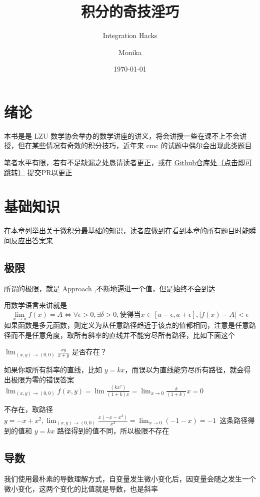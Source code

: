 \documentclass[lang=cn,newtx,10pt,scheme=chinese]{elegantbook}
\title{积分的奇技淫巧}
\subtitle{Integration Hacks}
\author{Monika}
\date{\today}
\begin{document}
\maketitle
\frontmatter

\tableofcontents

\chapter{绪论}
本书是是 LZU 数学协会举办的数学讲座的讲义，将会讲授一些在课不上不会讲授，但在某些情况有奇效的积分技巧，近年来 cmc 的试题中偶尔会出现此类题目

笔者水平有限，若有不足缺漏之处恳请读者更正，或在 \href{https://github.com/Monika-shipship/MonikaMathLecture}{Github仓库处（点击即可跳转）} 提交PR以更正
\mainmatter

\chapter{基础知识}
在本章列举出关于微积分最基础的知识，读者应做到在看到本章的所有题目时能瞬间反应出答案来
\section{极限}
所谓的极限，就是 Approach ,不断地逼进一个值，但是始终不会到达

用数学语言来讲就是
\begin{equation}
  \lim_{x \to a} f(x)=A \iff \forall \epsilon>0,\exists \delta>0, \text{使得当}x \in \left[ a-\epsilon,a+\epsilon \right], \left\vert f(x) -A\right\vert <\epsilon
\end{equation}
如果函数是多元函数，则定义为从任意路径趋近于该点的值都相同，注意是任意路径而不是任意角度，取所有斜率的直线并不能穷尽所有路径，比如下面这个
\begin{problem}
    $\lim_{(x,y) \to (0,0)} \frac{xy}{x+y} $ 是否存在？
  \end{problem}
  如果你取所有斜率的直线，比如 $y=kx$，而误以为直线能穷尽所有路径，就会得出极限为零的错误答案 $\lim_{(x,y) \to (0,0)} f(x,y)=\lim \frac{(kx^{2})}{(1+k)x}=\lim_{x \to 0} \frac{k}{(1+k)}x=0$
  \begin{solution}
    不存在，取路径 $y=-x+x^{2},\lim_{(x,y) \to (0,0)} \frac{x(-x-x^{2})}{x^{2}}=\lim_{x \to 0}(-1-x)=-1$\
    这条路径得到的值和 $y=kx$ 路径得到的值不同，所以极限不存在
  \end{solution}
\section{导数}
我们使用最朴素的导数理解方式，自变量发生微小变化后，因变量会随之发生一个微小变化，这两个变化的比值就是导数，也是斜率
\end{document}
